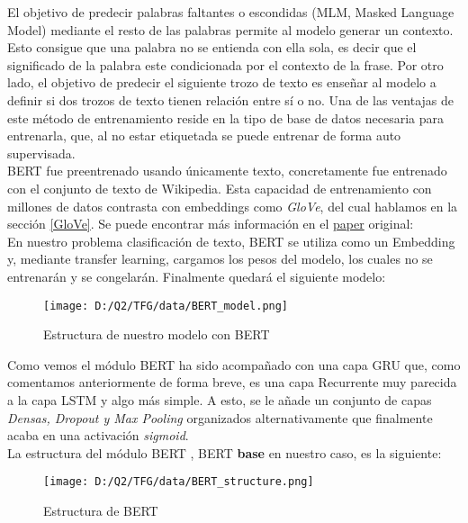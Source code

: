 \documentclass[10pt,riqno,a4paper,twoside]{article}\usepackage[]{graphicx}\usepackage[]{color}
\begin{document}
El objetivo de predecir palabras faltantes o escondidas (MLM, Masked Language Model) mediante el resto de las palabras permite al modelo generar un contexto. Esto consigue que una palabra no se entienda con ella sola, es decir que el significado de la palabra este condicionada por el contexto de la frase. Por otro lado, el objetivo de predecir el siguiente trozo de texto es enseñar al modelo a definir si dos trozos de texto tienen relación entre sí o no. Una de las ventajas de este método de entrenamiento reside en la tipo de base de datos necesaria para entrenarla, que, al no estar etiquetada se puede entrenar de forma auto supervisada.\\ 

BERT fue preentrenado usando únicamente texto, concretamente fue entrenado con el conjunto de texto de Wikipedia. Esta capacidad de entrenamiento con millones de datos contrasta con embeddings como \textit{GloVe}, del cual hablamos en la sección \ref{GloVe}. Se puede encontrar más información en el \href{https://arxiv.org/abs/1810.04805}{paper} \cite{BERT} original: \\

En nuestro problema clasificación de texto, BERT se utiliza como un Embedding y, mediante transfer learning, cargamos los pesos del modelo, los cuales no se entrenarán y se congelarán. Finalmente quedará el siguiente modelo: 


\begin{figure}[h]
  \caption{Estructura de nuestro modelo con BERT}
  \label{BERT_model}
  \begin{center}
\texttt{[image: D:/Q2/TFG/data/BERT\_model.png]}
\end{center}
\end{figure}


Como vemos el módulo BERT ha sido acompañado con una capa GRU que, como comentamos anteriormente de forma breve, es una capa Recurrente muy parecida a la capa LSTM y algo más simple. A esto, se le añade un conjunto de capas \textit{Densas, Dropout y Max Pooling} organizados alternativamente que finalmente acaba en una activación \textit{sigmoid}. \\
 

La estructura del módulo BERT \cite{evolved_transformer}, BERT \textbf{base} en nuestro caso, es la siguiente: 


\begin{figure}[h]
\caption{Estructura de BERT}
\begin{center}
\texttt{[image: D:/Q2/TFG/data/BERT\_structure.png]}
\end{center}
\end{figure}
\end{document}
